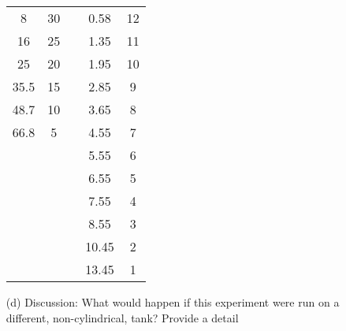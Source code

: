 \begin{lab}
\begin{enumerate}
\begin{center}
\begin{tabular}{|c|c|c|c|c|}
                    8      & 30  & &  0.58  &  12\\
                    16     & 25  & &  1.35  &  11\\
                    25     & 20  & &  1.95  &  10\\
                    35.5   & 15  & &  2.85  &  9\\
                    48.7   & 10  & &  3.65  &  8\\
                    66.8   & 5   & &  4.55  &  7\\
                    &     & &  5.55  &  6\\
                    &     & &  6.55  &  5\\
                    &     & &  7.55  &  4\\
                    &     & &  8.55  &  3\\
                    &     & &  10.45 &  2\\
                    &     & &  13.45 &  1\\\hline
                \end{tabular}
            \end{center}
        \item[(d)] Discussion: What would happen if this experiment were run on a different,
            non-cylindrical, tank? Provide a detail 
    \end{enumerate}
\end{lab}

